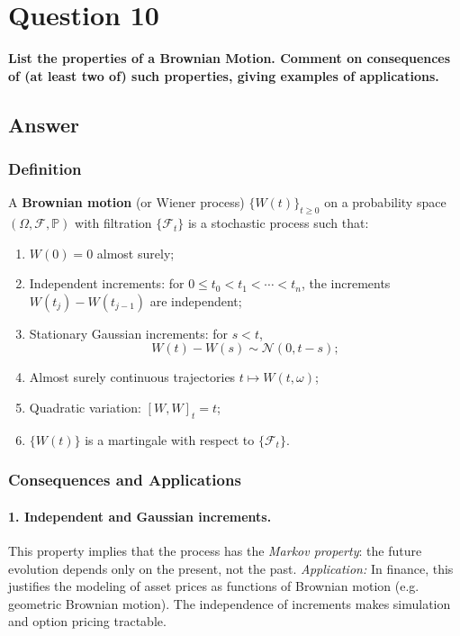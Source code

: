 \documentclass[12pt,a4paper]{book}
\theoremstyle{remark}
\newcommand{\PP}{\mathbb{P}}          %
\newcommand{\F}{\mathcal{F}}          %
\newcommand{\Normal}{\mathcal{N}}
\begin{document}
\newpage
\section{Question 10}
\textbf{List the properties of a Brownian Motion. Comment on consequences of (at least two of) such properties, giving examples of applications.}

\subsection*{Answer}

\subsubsection*{Definition}
A \textbf{Brownian motion} (or Wiener process) $\{W(t)\}_{t\ge 0}$ on a probability space $(\Omega,\F,\PP)$ with filtration $\{\F_t\}$ is a stochastic process such that:

\begin{enumerate}[label=\roman*)]
    \item $W(0)=0$ almost surely;
    \item Independent increments: for $0\le t_0 < t_1 < \cdots < t_n$, the increments $W(t_j)-W(t_{j-1})$ are independent;
    \item Stationary Gaussian increments: for $s<t$, 
    \[
    W(t)-W(s) \sim \Normal(0,t-s);
    \]
    \item Almost surely continuous trajectories $t\mapsto W(t,\omega)$;
    \item Quadratic variation: $[W,W]_t = t$;
    \item $\{W(t)\}$ is a martingale with respect to $\{\F_t\}$.
\end{enumerate}

\subsubsection*{Consequences and Applications}

\paragraph{1. Independent and Gaussian increments.}
This property implies that the process has the \emph{Markov property}: the future evolution depends only on the present, not the past.  
\emph{Application:} In finance, this justifies the modeling of asset prices as functions of Brownian motion (e.g. geometric Brownian motion). The independence of increments makes simulation and option pricing tractable.
\end{document}
